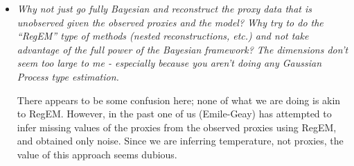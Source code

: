 \documentclass[11pt]{article}
\newcommand{\lb}[1]{\color{ForestGreen}\textbf{[Luis B.: #1]}\normalcolor}
\newcommand{\bl}[1]{\color{red}\textbf{[Bo: #1]}\normalcolor}
\newcommand{\jeg}[1]{\color{blue}\textbf{Julien: #1]}\normalcolor}
\begin{document}
\begin{itemize}

\item \textit{Why not just go fully Bayesian and reconstruct the proxy data that
    is unobserved given the observed proxies and the model? Why try to do the
    ``RegEM'' type of methods (nested reconstructions, etc.) and not take
    advantage of the full power of the Bayesian framework? The dimensions don't
    seem too large to me - especially because you aren't doing any Gaussian
    Process type estimation.
}


There appears to be some confusion here; none of what we are doing is akin to RegEM. However, in the past one of us (Emile-Geay) has attempted to infer missing values of the proxies from the observed proxies using RegEM, and obtained only noise. Since we are inferring temperature, not proxies, the value of this approach seems dubious.






\end{itemize}
\end{document}
